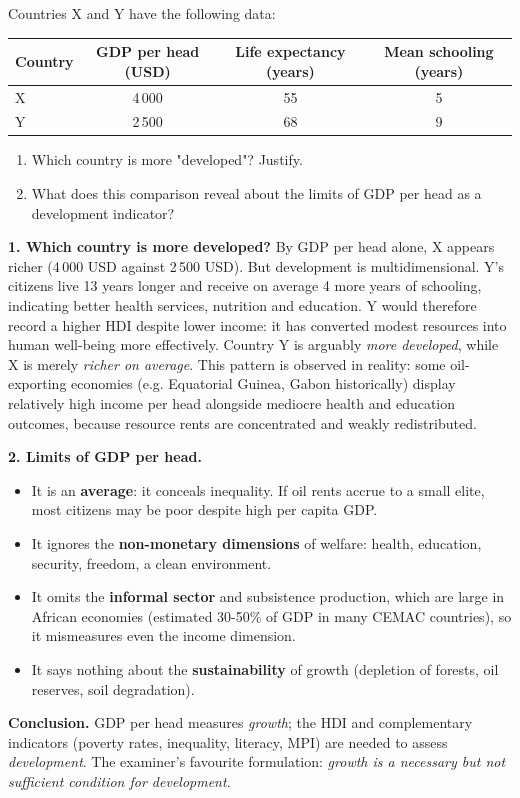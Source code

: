 \documentclass[11pt]{article}
\newcommand{\cle}[1]{{\popxbold\color{popdark}#1}}
\begin{document}
\begin{exoresolu}
Countries X and Y have the following data:
\begin{center}
\begin{tabular}{|l|c|c|c|}
\hline
\rowcolor{popblueL} Country & GDP per head (USD) & Life expectancy (years) & Mean schooling (years) \\
\hline
X & 4\,000 & 55 & 5 \\
\hline
Y & 2\,500 & 68 & 9 \\
\hline
\end{tabular}
\end{center}
\begin{enumerate}
\item Which country is more "developed"? Justify.
\item What does this comparison reveal about the limits of GDP per head as a development indicator?
\end{enumerate}
\tcblower
\textbf{1. Which country is more developed?} By GDP per head alone, X appears richer (4\,000 USD against 2\,500 USD). But development is multidimensional. Y's citizens live 13 years longer and receive on average 4 more years of schooling, indicating better health services, nutrition and education. Y would therefore record a higher \cle{HDI} despite lower income: it has converted modest resources into human well-being more effectively. Country Y is arguably \emph{more developed}, while X is merely \emph{richer on average}. This pattern is observed in reality: some oil-exporting economies (e.g. Equatorial Guinea, Gabon historically) display relatively high income per head alongside mediocre health and education outcomes, because resource rents are concentrated and weakly redistributed.

\textbf{2. Limits of GDP per head.}
\begin{itemize}
\item It is an \textbf{average}: it conceals inequality. If oil rents accrue to a small elite, most citizens may be poor despite high per capita GDP.
\item It ignores the \textbf{non-monetary dimensions} of welfare: health, education, security, freedom, a clean environment.
\item It omits the \textbf{informal sector} and subsistence production, which are large in African economies (estimated 30-50\% of GDP in many CEMAC countries), so it mismeasures even the income dimension.
\item It says nothing about the \textbf{sustainability} of growth (depletion of forests, oil reserves, soil degradation).
\end{itemize}
\textbf{Conclusion.} GDP per head measures \emph{growth}; the HDI and complementary indicators (poverty rates, inequality, literacy, MPI) are needed to assess \emph{development}. The examiner's favourite formulation: \emph{growth is a necessary but not sufficient condition for development}.
\end{exoresolu}
\end{document}
